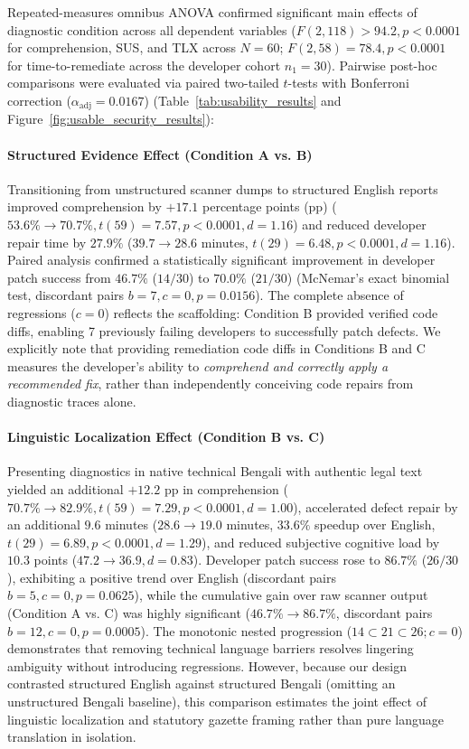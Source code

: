 Repeated-measures omnibus ANOVA confirmed significant main effects of diagnostic condition across all dependent variables ($F(2, 118) > 94.2, p < 0.0001$ for comprehension, SUS, and TLX across $N=60$; $F(2, 58) = 78.4, p < 0.0001$ for time-to-remediate across the developer cohort $n_1=30$). Pairwise post-hoc comparisons were evaluated via paired two-tailed $t$-tests with Bonferroni correction ($\alpha_{\text{adj}} = 0.0167$) (Table~\ref{tab:usability_results} and Figure~\ref{fig:usable_security_results}):

\paragraph{Structured Evidence Effect (Condition A vs. B)} Transitioning from unstructured scanner dumps to structured English reports improved comprehension by $+17.1$ percentage points (pp) ($53.6\% \rightarrow 70.7\%, t(59) = 7.57, p < 0.0001, d = 1.16$) and reduced developer repair time by $27.9\%$ ($39.7 \rightarrow 28.6$ minutes, $t(29) = 6.48, p < 0.0001, d = 1.16$). Paired analysis confirmed a statistically significant improvement in developer patch success from $46.7\%$ ($14/30$) to $70.0\%$ ($21/30$) (McNemar's exact binomial test, discordant pairs $b=7, c=0, p = 0.0156$). The complete absence of regressions ($c=0$) reflects the scaffolding: Condition B provided verified code diffs, enabling 7 previously failing developers to successfully patch defects. We explicitly note that providing remediation code diffs in Conditions B and C measures the developer's ability to \textit{comprehend and correctly apply a recommended fix}, rather than independently conceiving code repairs from diagnostic traces alone.

\paragraph{Linguistic Localization Effect (Condition B vs. C)} Presenting diagnostics in native technical Bengali with authentic legal text yielded an additional $+12.2$ pp in comprehension ($70.7\% \rightarrow 82.9\%, t(59) = 7.29, p < 0.0001, d = 1.00$), accelerated defect repair by an additional $9.6$ minutes ($28.6 \rightarrow 19.0$ minutes, $33.6\%$ speedup over English, $t(29) = 6.89, p < 0.0001, d = 1.29$), and reduced subjective cognitive load by $10.3$ points ($47.2 \rightarrow 36.9, d = 0.83$). Developer patch success rose to $86.7\%$ ($26/30$), exhibiting a positive trend over English (discordant pairs $b=5, c=0, p = 0.0625$), while the cumulative gain over raw scanner output (Condition A vs. C) was highly significant ($46.7\% \rightarrow 86.7\%$, discordant pairs $b=12, c=0, p = 0.0005$). The monotonic nested progression ($14 \subset 21 \subset 26; c=0$) demonstrates that removing technical language barriers resolves lingering ambiguity without introducing regressions. However, because our design contrasted structured English against structured Bengali (omitting an unstructured Bengali baseline), this comparison estimates the joint effect of linguistic localization and statutory gazette framing rather than pure language translation in isolation.

